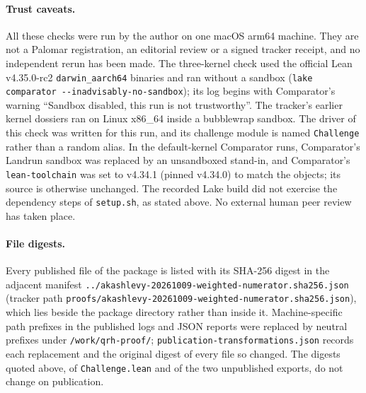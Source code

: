 \documentclass[11pt]{article}
\begin{document}
\paragraph{Trust caveats.}
All these checks were run by the author on one macOS arm64 machine. They
are not a Palomar registration, an editorial review or a signed tracker
receipt, and no independent rerun has been made. The three-kernel check
used the official Lean v4.35.0-rc2 \nolinkurl{darwin_aarch64} binaries
and ran without a sandbox (\texttt{lake comparator
-{}-inadvisably-no-sandbox}); its log begins with Comparator's warning
``Sandbox disabled, this run is not trustworthy''. The tracker's
earlier kernel dossiers ran on Linux x86\_64 inside a bubblewrap
sandbox. The driver of this check was written for this run, and its
challenge module is named \nolinkurl{Challenge} rather than a random
alias. In the default-kernel Comparator runs, Comparator's Landrun
sandbox was replaced by an unsandboxed stand-in, and Comparator's
\nolinkurl{lean-toolchain} was set to v4.34.1 (pinned v4.34.0) to match
the objects; its source is otherwise unchanged. The recorded Lake build
did not exercise the dependency steps of \nolinkurl{setup.sh}, as stated
above. No external human peer review has taken place.

\paragraph{File digests.}
Every published file of the package is listed with its SHA-256 digest in
the adjacent manifest
\nolinkurl{../akashlevy-20261009-weighted-numerator.sha256.json} (tracker
path \nolinkurl{proofs/akashlevy-20261009-weighted-numerator.sha256.json}),
which lies beside the package directory rather than inside it.
Machine-specific path prefixes in the published logs and JSON reports
were replaced by neutral prefixes under \nolinkurl{/work/qrh-proof/};
\nolinkurl{publication-transformations.json} records each replacement and
the original digest of every file so changed. The digests quoted above,
of \nolinkurl{Challenge.lean} and of the two unpublished exports, do not
change on publication.
\end{document}
